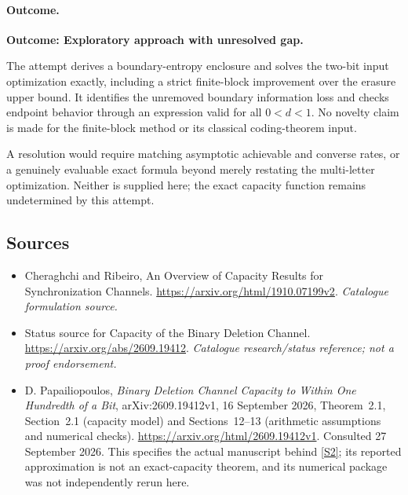 \documentclass[11pt,a4paper]{article}
\newcommand{\sref}[2]{\hyperlink{source:#1:#2}{[S#2]}}
\numberwithin{equation}{section}
\begin{document}
\paragraph{Outcome.}
\textbf{Outcome: Exploratory approach with unresolved gap.}

The attempt derives a boundary-entropy enclosure and solves the two-bit
input optimization exactly, including a strict finite-block improvement
over the erasure upper bound. It identifies the unremoved boundary
information loss and checks endpoint behavior through an expression
valid for all $0<d<1$. No novelty claim is made for the finite-block
method or its classical coding-theorem input.

A resolution would require matching asymptotic achievable and converse
rates, or a genuinely evaluable exact formula beyond merely restating
the multi-letter optimization. Neither is supplied here; the exact
capacity function remains undetermined by this attempt.
\subsection{Sources}
\begin{itemize}\raggedright
\item[\textnormal{[S1]}]\hypertarget{source:statement:1}{} Cheraghchi and Ribeiro, An Overview of Capacity Results for Synchronization Channels.
\url{https://arxiv.org/html/1910.07199v2}.
{\small\textit{Catalogue formulation source.}}
\item[\textnormal{[S2]}]\hypertarget{source:statement:2}{} Status source for Capacity of the Binary Deletion Channel.
\url{https://arxiv.org/abs/2609.19412}.
{\small\textit{Catalogue research/status reference; not a proof endorsement.}}
\item[\textnormal{[E1]}]\hypertarget{extra:statement:1}{}
D. Papailiopoulos, \emph{Binary Deletion Channel Capacity to Within One
Hundredth of a Bit}, arXiv:2609.19412v1, 16 September 2026,
Theorem~2.1, Section~2.1 (capacity model) and Sections~12--13
(arithmetic assumptions and numerical checks).
\url{https://arxiv.org/html/2609.19412v1}.
Consulted 27 September 2026. This specifies the actual manuscript behind
\sref{statement}{2}; its reported approximation is not an exact-capacity theorem,
and its numerical package was not independently rerun here.
\end{itemize}
\end{document}
